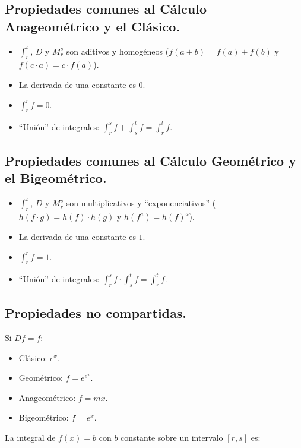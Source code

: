 \newpage

\subsection{Propiedades comunes al Cálculo Anageométrico y el Clásico.}

\begin{itemize}	
	\item $\int_r^s$, $D$ y $M_r^s$ son aditivos y homogéneos ($f(a + b) = f(a) + f(b)$ y $f(c\cdot a) = c\cdot f(a)$).
	\item La derivada de una constante es $0$.
	\item $\int_r^r f = 0$.
	\item \enquote{Unión} de integrales: $\int_r^s f + \int_s^t f = \int_r^t f$.
\end{itemize}

\subsection{Propiedades comunes al Cálculo Geométrico y el Bigeométrico.}

\begin{itemize}
	\item $\int_r^s$, $D$ y $M_r^s$ son multiplicativos y \enquote{exponenciativos} ($h(f\cdot g) = h(f)\cdot h(g)$ y $h(f^a) = h(f)^a$).
	\item La derivada de una constante es $1$.
	\item $\int_r^r f = 1$.
	\item \enquote{Unión} de integrales: $\int_r^s f \cdot \int_s^t f = \int_r^t f$.
\end{itemize}

\subsection{Propiedades no compartidas.}

Si $Df = f$:

\begin{itemize}
	\item Clásico: $e^x$.
	\item Geométrico: $f = e^{e^x}$.
	\item Anageométrico: $f = mx$.
	\item Bigeométrico: $f = e^x$.
\end{itemize}

La integral de $f(x) = b$ con $b$ constante sobre un intervalo $[r, s]$ es:

